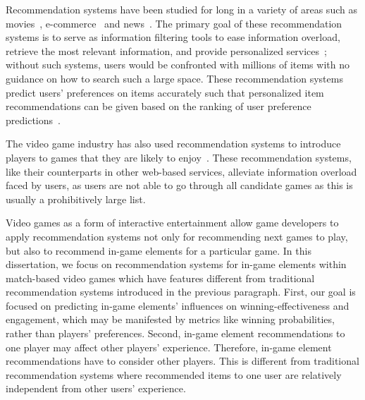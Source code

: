 

Recommendation systems have been studied for long in a variety of areas such as movies~\citep{amatriain2012netflix}, e-commerce~\citep{linden2003amazon} and news~\citep{das2007google}. The primary goal of these recommendation systems is to serve as information filtering tools to ease information overload, retrieve the most relevant information, and provide personalized services~\citep{isinkaye2015recommendation,bobadilla2013recommender,resnick1997recommender,adomavicius2005toward}; without such systems, users would be confronted with millions of items with no guidance on how to search such a large space. These recommendation systems predict users' preferences on items accurately such that personalized item recommendations can be given based on the ranking of user preference predictions~\citep{liang2006personalized}. 

The video game industry has also used recommendation systems to introduce players to games that they are likely to enjoy~\citep{sifa2014archetypal,orland10,skocir2012mars,wu2017recommendation}. These recommendation systems, like their counterparts in other web-based services, alleviate information overload faced by users, as users are not able to go through all candidate games as this is usually a prohibitively large list. 

Video games as a form of interactive entertainment allow game developers to apply recommendation systems not only for recommending next games to play, but also to recommend in-game elements for a particular game. In this dissertation, we focus on recommendation systems for in-game elements within match-based video games which have  features different from traditional recommendation systems introduced in the previous paragraph. First, our goal is focused on predicting in-game elements' influences on winning-effectiveness and engagement, which may be manifested by metrics like winning probabilities, rather than players' preferences. Second, in-game element recommendations to one player may affect other players' experience. Therefore, in-game element recommendations have to consider other players. This is different from traditional recommendation systems where recommended items to one user are relatively independent from other users' experience.

